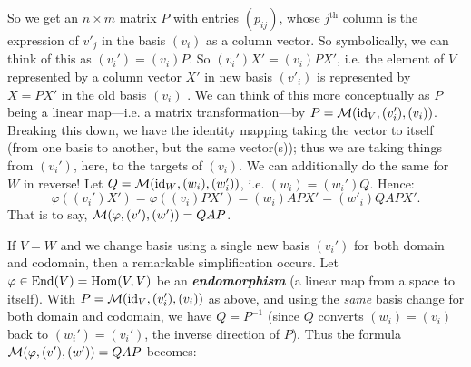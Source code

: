 \documentclass{report}
\begin{document}
So we get an \( n \times  m \) matrix \(P \) with entries \( (p_{ij}) \), whose \( j^\text{th} \) column is the expression of \( v'_j \) in the basis \( (v_i) \) as a column vector. So symbolically, we can think of this as \( (v_i')=(v_i)P \). So \( (v_i')X'=(v_i)PX' \), i.e. the element of \( V \) represented by a column vector \( X' \) in new basis \( (v'_i) \) is represented by \( X=PX' \) in the old basis \( (v_i) \) . We can think of this more conceptually as \( P \) being a linear map---i.e. a matrix transformation---by \( P = \mathcal{M} (\text{id}_V,(v_i'),(v_i)) \). Breaking this down, we have the identity mapping taking the vector to itself (from one basis to another, but the same vector(s)); thus we are taking things from \( (v_i') \), here, to the targets of \( (v_i) \). We can additionally do the same for \( W \) in reverse! Let \( Q = \mathcal{M} (\text{id}_W,(w_i),(w_i'))\), i.e. \( (w_i)=(w_i')Q \). Hence: \[ \varphi((v_i')X') =\varphi((v_i)PX')=(w_i)APX'=(w'_i)QAPX'.\]
That is to say, \( \mathcal{M}(\varphi ,(v'),(w'))=QAP \).


If \( V=W \) and we change basis using a single new basis \( (v_i') \) for both domain and codomain, then a remarkable simplification occurs. Let \(\varphi \in \operatorname{End}(V) = \operatorname{Hom}(V, V)\) be an \textbf{\emph{endomorphism}} (a linear map from a space to itself). With \(P = \mathcal{M}(\text{id}_V, (v_i'), (v_i))\) as above, and using the \emph{same} basis change for both domain and codomain, we have \(Q = P^{-1}\) (since \(Q\) converts \((w_i) = (v_i)\) back to \((w_i') = (v_i')\), the inverse direction of \(P\)). Thus the formula \(\mathcal{M}(\varphi, (v'), (w')) = QAP\) becomes:


\end{document}
